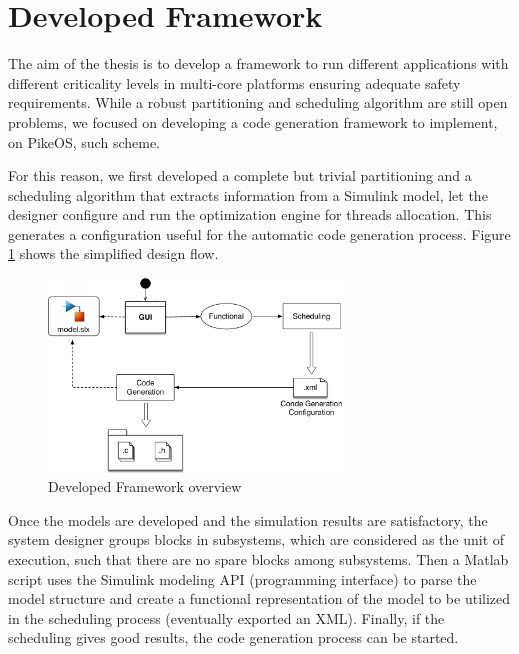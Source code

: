 \section{Developed Framework}\label{sec:DevelopedFramework}
The aim of the thesis is to develop a framework to run different applications with different criticality levels in multi-core platforms ensuring adequate safety requirements. While a robust partitioning and scheduling algorithm are still open problems, we focused on developing a code generation framework to implement, on PikeOS, such scheme.
\par For this reason, we first developed a complete but trivial partitioning and a scheduling algorithm that extracts information from a Simulink model, let the designer configure and run the optimization engine for threads allocation. This generates a configuration useful for the automatic code generation process. Figure \ref{fig:FrameworkOverview} shows the simplified design flow.
\begin{figure}[htbp] 
\centering    
\includegraphics[width=0.7\textwidth]{FrameworkOverview}
\caption{Developed Framework overview}
\label{fig:FrameworkOverview}
\end{figure}
\par Once the models are developed and the simulation results are satisfactory, the system designer groups blocks in subsystems, which are considered as the unit of execution, such that there are no spare blocks among subsystems. Then a Matlab script uses the Simulink modeling API (programming interface) to parse the model structure and create a functional representation of the model to be utilized in the scheduling process (eventually exported an XML). Finally, if the scheduling gives good results, the code generation process can be started.

